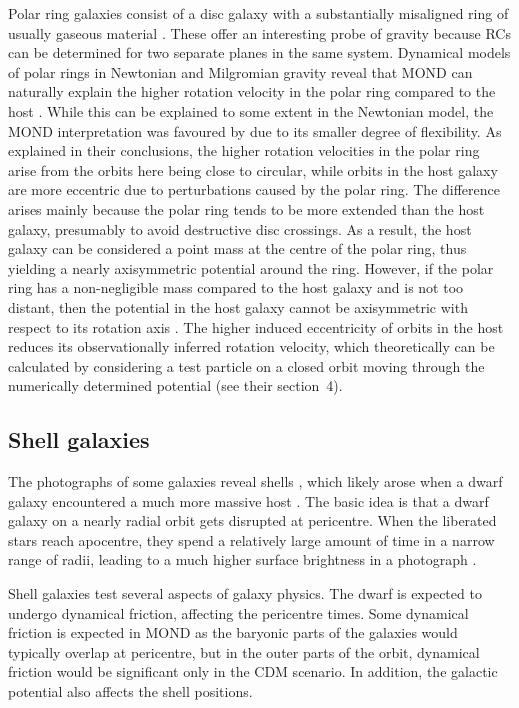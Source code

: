\documentclass[fleqn,usenatbib,useAMS]{mnras} %
\begin{document}
Polar ring galaxies \citep{Bertola_1978} consist of a disc galaxy with a substantially misaligned ring of usually gaseous material \citep[for a review, see][]{Combes_2014_polar_rings}. These offer an interesting probe of gravity because RCs can be determined for two separate planes in the same system. Dynamical models of polar rings in Newtonian and Milgromian gravity reveal that MOND can naturally explain the higher rotation velocity in the polar ring compared to the host \citep{Lughausen_2013}. While this can be explained to some extent in the Newtonian model, the MOND interpretation was favoured by \citet{Lughausen_2014} due to its smaller degree of flexibility. As explained in their conclusions, the higher rotation velocities in the polar ring arise from the orbits here being close to circular, while orbits in the host galaxy are more eccentric due to perturbations caused by the polar ring. The difference arises mainly because the polar ring tends to be more extended than the host galaxy, presumably to avoid destructive disc crossings. As a result, the host galaxy can be considered a point mass at the centre of the polar ring, thus yielding a nearly axisymmetric potential around the ring. However, if the polar ring has a non-negligible mass compared to the host galaxy and is not too distant, then the potential in the host galaxy cannot be axisymmetric with respect to its rotation axis \citep{Lughausen_2013}. The higher induced eccentricity of orbits in the host reduces its observationally inferred rotation velocity, which theoretically can be calculated by considering a test particle on a closed orbit moving through the numerically determined potential (see their section~4).



\subsection{Shell galaxies}
\label{Shell_galaxies}

The photographs of some galaxies reveal shells \citep{Schweizer_1980}, which likely arose when a dwarf galaxy encountered a much more massive host \citep{Quinn_1984}. The basic idea is that a dwarf galaxy on a nearly radial orbit gets disrupted at pericentre. When the liberated stars reach apocentre, they spend a relatively large amount of time in a narrow range of radii, leading to a much higher surface brightness in a photograph \citep{Hernquist_1987}.

Shell galaxies test several aspects of galaxy physics. The dwarf is expected to undergo dynamical friction, affecting the pericentre times. Some dynamical friction is expected in MOND as the baryonic parts of the galaxies would typically overlap at pericentre, but in the outer parts of the orbit, dynamical friction would be significant only in the CDM scenario. In addition, the galactic potential also affects the shell positions.
\end{document}
